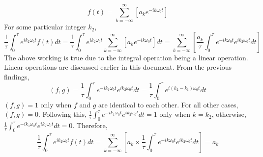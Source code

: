 $$f(t) = \sum^{\infty}_{k = -\infty}\left[a_ke^{-ik\omega_0t}\right]$$
For some particular integer $k_2$,
$$\frac{1}{\tau}\int^{\tau}_{0}e^{ik_2\omega_0t}f(t)dt= \frac{1}{\tau}\int^{\tau}_{0}e^{ik_2\omega_0t}\sum^{\infty}_{k = -\infty}\left[a_ke^{-ik\omega_0t}\right]dt = \sum^{\infty}_{k = -\infty}\left[\frac{a_k}{\tau}\int^{\tau}_{0}e^{-ik\omega_0t}e^{ik_2\omega_0t}dt\right]$$
The above working is true due to the integral operation being a linear operation. Linear operations are discussed earlier in this document. From the previous findings,
$$(f,g) = \frac{1}{\tau}\int^{\tau}_{0}e^{-ik_1\omega_0t} e^{ik_2\omega_0t}dt = \frac{1}{\tau}\int^{\tau}_{0}e^{i(k_2-k_1)\omega_0t}dt$$
$(f,g) = 1$ only when $f$ and $g$ are identical to each other. For all other cases, $(f,g) = 0$. Following this, $\displaystyle{\frac{1}{\tau}\int^{\tau}_{0}e^{-ik_1\omega_0t} e^{ik_2\omega_0t}dt} = 1$ only when $k = k_2$, otherwise, $\displaystyle{\frac{1}{\tau}\int^{\tau}_{0}e^{-ik_1\omega_0t} e^{ik_2\omega_0t}dt} = 0$. Therefore,
$$\frac{1}{\tau}\int^{\tau}_{0}e^{ik_2\omega_0t}f(t)dt = \sum^{\infty}_{k = -\infty}\left[a_k\times\frac{1}{\tau}\int^{\tau}_{0}e^{-ik\omega_0t}e^{ik_2\omega_0t}dt\right] = a_k$$

